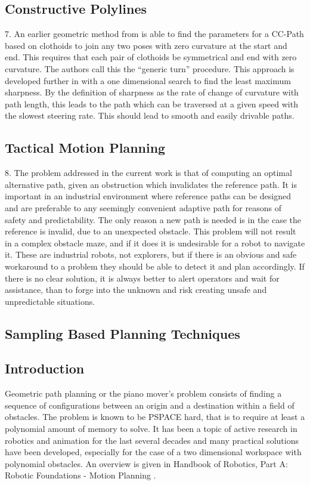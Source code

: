 \subsection{Constructive Polylines}
7. An earlier geometric method from \cite{Henrie2007} is able to find the parameters for a CC-Path based on clothoids to join any two poses with zero curvature at the start and end. This requires that each pair of clothoids be symmetrical and end with zero curvature. The authors call this the ``generic turn'' procedure. This approach is developed further in \cite{Wilde2009} with a one dimensional search to find the least maximum sharpness. By the definition of sharpness as the rate of change of curvature with path length, this leads to the path which can be traversed at a given speed with the slowest steering rate. This should lead to smooth and easily drivable paths.

\subsection{Tactical Motion Planning}
8. The problem addressed in the current work is that of computing an optimal alternative path, given an obstruction which invalidates the reference path. It is important in an industrial environment where reference paths can be designed and are preferable to any seemingly convenient adaptive path for reasons of safety and predictability. The only reason a new path is needed is in the case the reference is invalid, due to an unexpected obstacle. This problem will not result in a complex obstacle maze, and if it does it is undesirable for a robot to navigate it. These are industrial robots, not explorers, but if there is an obvious and safe workaround to a problem they should be able to detect it and plan accordingly. If there is no clear solution, it is always better to alert operators and wait for assistance, than to forge into the unknown and risk creating unsafe and unpredictable situations.  

\subsection{Sampling Based Planning Techniques}
\label{sec:sampling_based}
\subsection{Introduction}
Geometric path planning or the piano mover's problem consists of finding a sequence of configurations between an origin and a destination within a field of obstacles. The problem is known to be PSPACE hard, that is to require at least a polynomial amount of memory to solve. It has been a topic of active research in robotics and animation for the last several decades and many practical  solutions have been developed, especially for the case of a two dimensional workspace with polynomial obstacles. An overview is given in Handbook of Robotics, Part A: Robotic Foundations - Motion Planning \cite{SicilianoKhatib2016}. 


